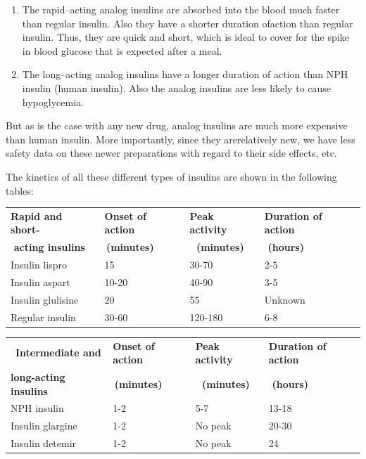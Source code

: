 \begin{enumerate}[•]
\itemsep=0pt
\item The rapid–acting analog insulins are absorbed into the blood much faster than regular insulin. Also they have a shorter duration of\break action than regular insulin. Thus, they are quick and short, which is ideal to cover for the spike in blood glucose that is expected after a meal.
\item The long–acting analog insulins have a longer duration of action than NPH insulin (human insulin). Also the analog insulins are less likely to cause hypoglycemia.
\end{enumerate}

But as is the case with any new drug, analog insulins are much more expensive than human insulin. More importantly, since they are\break relatively new, we have less safety data on these newer preparations with regard to their side effects, etc.

The kinetics of all these different types of insulins are shown in the following tables:

{
\begin{center}
\small\addtolength{\tabcolsep}{-2pt}
\begin{tabular}{|l|l|l|l|}
\hline
\textbf{Rapid and short-} & \textbf{Onset of action} & \textbf{Peak activity} & \textbf{Duration of action}\\
\,\,\textbf{acting insulins} & \,\quad\textbf{(minutes)} & \,\,\,\,\textbf{(minutes)} & \,\,\qquad\textbf{(hours)}\\
\hline
Insulin lispro & 15 & 30-70 & 2-5\\
\hline
Insulin aspart & 10-20 & 40-90 & 3-5\\
\hline
Insulin glulisine & 20 & 55 & Unknown\\
\hline
Regular insulin & 30-60 & 120-180 & 6-8\\
\hline
\end{tabular}
\end{center}
}\relax

{
\begin{center}
\small\addtolength{\tabcolsep}{-4pt}
\begin{tabular}{|l|l|l|l|}
\hline
\,\,\,\textbf{Intermediate and} & \textbf{Onset of action} & \textbf{Peak activity} & \textbf{Duration of action}\\
\textbf{long-acting insulins} & \,\quad\textbf{(minutes)} & \,\,\,\,\textbf{(minutes)} & \,\,\qquad\textbf{(hours)}\\
\hline
NPH insulin & 1-2 & 5-7 & 13-18\\
\hline
Insulin glargine & 1-2 & No peak & 20-30\\
\hline
Insulin detemir & 1-2 & No peak & 24\\
\hline
\end{tabular}
\end{center}
}\relax

